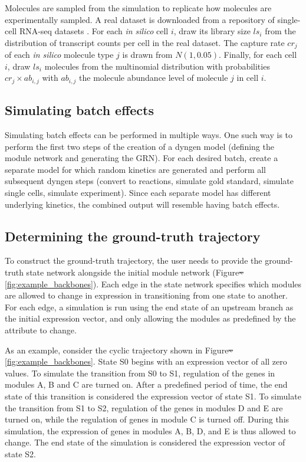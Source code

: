 \documentclass[
  table,
  10pt,
  a4paper]{article}
\providecommand{\DIFaddtex}[1]{{\protect\color{blue}\uwave{#1}}} %
\providecommand{\DIFdeltex}[1]{{\protect\color{red}\sout{#1}}}                      %
\providecommand{\DIFaddbegin}{} %
\providecommand{\DIFaddend}{} %
\providecommand{\DIFdelbegin}{} %
\providecommand{\DIFdelend}{} %
\providecommand{\DIFadd}[1]{\texorpdfstring{\DIFaddtex{#1}}{#1}} %
\providecommand{\DIFdel}[1]{\texorpdfstring{\DIFdeltex{#1}}{}} %
\newcommand{\DIFscaledelfig}{0.5}
\newlength{\DIFdelgraphicswidth} %
\newlength{\DIFdelgraphicsheight} %
\newcommand{\DIFaddincludegraphics}[2][]{{\color{blue}\fbox{\DIFOincludegraphics[#1]{#2}}}} %
\newcommand{\DIFdelincludegraphics}[2][]{%
\sbox{\DIFdelgraphicsbox}{\DIFOincludegraphics[#1]{#2}}%
\settoboxwidth{\DIFdelgraphicswidth}{\DIFdelgraphicsbox} %
\settoboxtotalheight{\DIFdelgraphicsheight}{\DIFdelgraphicsbox} %
\scalebox{\DIFscaledelfig}{%
\parbox[b]{\DIFdelgraphicswidth}{\usebox{\DIFdelgraphicsbox}\\[-\baselineskip] \rule{\DIFdelgraphicswidth}{0em}}\llap{\resizebox{\DIFdelgraphicswidth}{\DIFdelgraphicsheight}{%
\setlength{\unitlength}{\DIFdelgraphicswidth}%
\begin{picture}(1,1)%
\thicklines\linethickness{2pt} %
{\color[rgb]{1,0,0}\put(0,0){\framebox(1,1){}}}%
{\color[rgb]{1,0,0}\put(0,0){\line( 1,1){1}}}%
{\color[rgb]{1,0,0}\put(0,1){\line(1,-1){1}}}%
\end{picture}%
}\hspace*{3pt}}} %
} %
\DeclareRobustCommand{\DIFaddbegin}{\DIFOaddbegin \let\includegraphics\DIFaddincludegraphics} %
\DeclareRobustCommand{\DIFaddend}{\DIFOaddend \let\includegraphics\DIFOincludegraphics} %
\DeclareRobustCommand{\DIFdelbegin}{\DIFOdelbegin \let\includegraphics\DIFdelincludegraphics} %
\DeclareRobustCommand{\DIFdelend}{\DIFOaddend \let\includegraphics\DIFOincludegraphics} %
\begin{document}
Molecules are sampled from the simulation to replicate how molecules are
experimentally sampled. A real dataset is downloaded from a repository
of single-cell RNA-seq datasets
\autocite{cannoodt_singlecellomicsdatasets_2018}. For each \emph{in
silico} cell \(i\), draw its library size \(ls_i\) from the distribution
of transcript counts per cell in the real dataset. The capture rate
\(cr_j\) of each \emph{in silico} molecule type \(j\) is drawn from
\(N(1, 0.05)\). Finally, for each cell \(i\), draw \(ls_i\) molecules
from the multinomial distribution with probabilities
\(cr_j \times ab_{i,j}\) with \(ab_{i,j}\) the molecule abundance level
of molecule \(j\) in cell \(i\).

\hypertarget{sec:dyngen-batcheffect}{%
\subsection{Simulating batch effects}\label{sec:dyngen-batcheffect}}

Simulating batch effects can be performed in multiple ways. One such way
is to perform the first two steps of the creation of a dyngen model
(defining the module network and generating the GRN). For each desired
batch, create a separate model for which random kinetics are generated
and perform all subsequent dyngen steps (convert to reactions, simulate
gold standard, simulate single cells, simulate experiment). Since each
separate model has different underlying kinetics, the combined output
will resemble having batch effects.

\hypertarget{sec:dyngen-groundtruth}{%
\subsection{Determining the ground-truth
trajectory}\label{sec:dyngen-groundtruth}}

To construct the ground-truth trajectory, the user needs to provide the
ground-truth state network alongside the initial module network
(Figure\DIFdelbegin \DIFdel{\textasciitilde{}}\DIFdelend \DIFaddbegin \DIFadd{~}\DIFaddend \ref{fig:example_backbones}). Each edge in the state network
specifies which modules are allowed to change in expression in
transitioning from one state to another. For each edge, a simulation is
run using the end state of an upstream branch as the initial expression
vector, and only allowing the modules as predefined by the attribute to
change.

As an example, consider the cyclic trajectory shown in
Figure\DIFdelbegin \DIFdel{\textasciitilde{}}\DIFdelend \DIFaddbegin \DIFadd{~}\DIFaddend \ref{fig:example_backbones}. State S0 begins with an expression
vector of all zero values. To simulate the transition from S0 to S1,
regulation of the genes in modules A, B and C are turned on. After a
predefined period of time, the end state of this transition is
considered the expression vector of state S1. To simulate the transition
from S1 to S2, regulation of the genes in modules D and E are turned on,
while the regulation of genes in module C is turned off. During this
simulation, the expression of genes in modules A, B, D, and E is thus
allowed to change. The end state of the simulation is considered the
expression vector of state S2.
\end{document}
